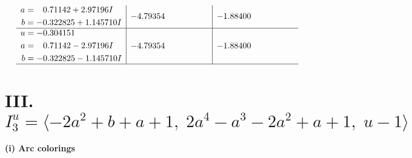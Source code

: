\documentclass[1p]{elsarticle_modified}
\theoremstyle{definition}
\begin{document}
$$\begin{array}{c|c|c}
\begin{aligned}
a &= \phantom{-}0.71142 + 2.97196 I \\
b &= -0.322825 + 1.145710 I\end{aligned}
 & -4.79354\phantom{ +0.000000I} & -1.88400\phantom{ +0.000000I} \\ \hline\begin{aligned}
u &= -0.304151\phantom{ +0.000000I} \\
a &= \phantom{-}0.71142 - 2.97196 I \\
b &= -0.322825 - 1.145710 I\end{aligned}
 & -4.79354\phantom{ +0.000000I} & -1.88400\phantom{ +0.000000I}\\
 \hline 
 \end{array}$$\newpage\newpage\renewcommand{\arraystretch}{1}
\centering \section*{III. $I^u_{3}= \langle -2 a^2+b+a+1,\;2 a^4- a^3-2 a^2+a+1,\;u-1 \rangle$}
\flushleft \textbf{(i) Arc colorings}\\
\end{document}
